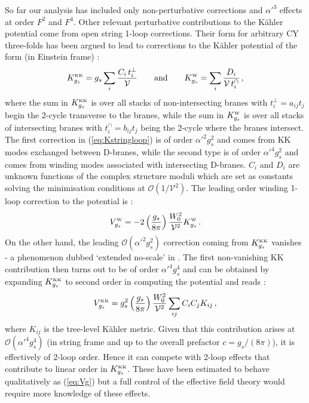 \documentclass[11pt,a4paper]{article}
\newcommand{\be}{\begin{equation}}
\newcommand{\ee}{\end{equation}}
\def\KK{{\scriptscriptstyle \rm KK}}
\def\W{{\scriptscriptstyle \rm W}}
\newcommand\vo{{\mathcal{V}}}
\newcommand{\mc}{\mathcal}
\begin{document}
So far our analysis has included only non-perturbative corrections and $\alpha'^3$ effects at order $F^2$ and $F^4$. Other relevant perturbative contributions to the K\"ahler potential come from open string 1-loop corrections. Their form for arbitrary CY three-folds has been argued to lead to corrections to the K\"ahler potential of the form (in Einstein frame) \cite{Berg:2007wt}:
\be
K_{g_s}^\KK=g_s \sum_i\frac{C_i \,t^\perp_i}{\vo}\qquad\text{and}\qquad K_{g_s}^\W=\sum_i \frac{D_i}{\vo \,t^\cap_i}\,,
\label{eq:Kstringloop}
\ee
where the sum in $K_{g_s}^\KK$ is over all stacks of non-intersecting branes with $t^\perp_i= a_{ij} t_j$ begin the 2-cycle transverse to the branes, while the sum in $K_{g_s}^\W$ is over all stacks of intersecting branes with $t^\cap_i = b_{ij}t_j$ being the 2-cycle where the branes intersect. The first correction in (\ref{eq:Kstringloop}) is of order $\alpha'^2 g_s^2$ and comes from KK modes exchanged between D-branes, while the second type is of order $\alpha'^4 g_s^2$ and comes from winding modes associated with intersecting D-branes. $C_i$ and $D_i$ are unknown functions of the complex structure moduli which are set as constants solving the minimisation conditions at $\mc{O}(1/\vo^2)$. The leading order winding 1-loop correction to the potential is \cite{Cicoli:2007xp}:
\be
V_{g_s}^\W=-2 \left(\frac{g_s}{8\pi}\right)\frac{W_0^2}{\vo^2}K_{g_s}^\W\,.
\label{eq:Vstringloop}
\ee
On the other hand, the leading $\mc{O}(\alpha'^2 g_s^2)$ correction coming from $K_{g_s}^\KK$ vanishes - a phenomenon dubbed `extended no-scale' in \cite{Cicoli:2007xp}. The first non-vanishing KK contribution then turns out to be of order $\alpha'^4 g_s^4$ and can be obtained by expanding $K_{g_s}^\KK$ to second order in computing the potential and reads \cite{Cicoli:2007xp}:
\be
V_{g_s}^\KK=g_s^2 \left(\frac{g_s}{8\pi}\right)\frac{W_0^2}{\vo^2}\sum_{ij} C_i C_j K_{ij}\,,
\label{eq:Vg}
\ee
where $K_{ij}$ is the tree-level K\"ahler metric. Given that this contribution arises at $\mc{O}(\alpha'^4 g_s^4)$ (in string frame and up to the overall prefactor $c=g_s/(8\pi)$), it is effectively of 2-loop order. Hence it can compete with 2-loop effects that contribute to linear order in $K_{g_s}^\KK$. These have been estimated to behave qualitatively as (\ref{eq:Vg}) \cite{Cicoli:2008gp} but a full control of the effective field theory would require more knowledge of these effects. 
\end{document}
